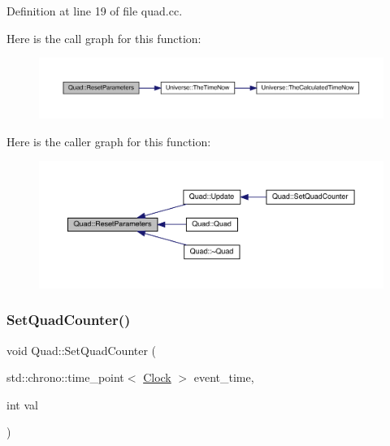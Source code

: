 Definition at line 19 of file quad.\+cc.

Here is the call graph for this function\+:\nopagebreak
\begin{figure}[H]
\begin{center}
\leavevmode
\includegraphics[width=350pt]{class_quad_af7c18022d7db1ad20bb7a1e1bd1ffb90_cgraph}
\end{center}
\end{figure}
Here is the caller graph for this function\+:
\nopagebreak
\begin{figure}[H]
\begin{center}
\leavevmode
\includegraphics[width=350pt]{class_quad_af7c18022d7db1ad20bb7a1e1bd1ffb90_icgraph}
\end{center}
\end{figure}
\mbox{\label{class_quad_a66ba58a32cf7b351e3e155efbdb46f8e}} 
\subsubsection{\texorpdfstring{Set\+Quad\+Counter()}{SetQuadCounter()}}
{\footnotesize\ttfamily void Quad\+::\+Set\+Quad\+Counter (\begin{DoxyParamCaption}\item[{std\+::chrono\+::time\+\_\+point$<$ \hyperlink{universe_8h_a0ef8d951d1ca5ab3cfaf7ab4c7a6fd80}{Clock} $>$}]{event\+\_\+time,  }\item[{int}]{val }\end{DoxyParamCaption})\hspace{0.3cm}{\ttfamily [inline]}}



